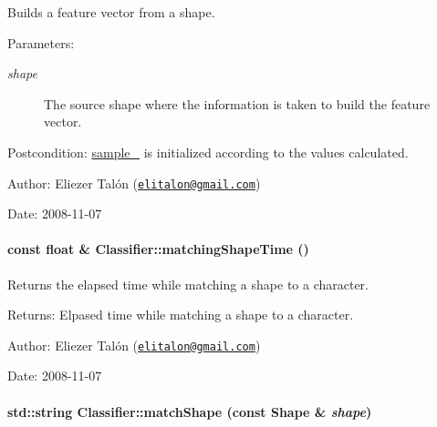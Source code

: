 Builds a feature vector from a shape. 

\begin{Desc}
\item[Parameters:]
\begin{description}
\item[{\em shape}]The source shape where the information is taken to build the feature vector.\end{description}
\end{Desc}
\begin{Desc}
\item[Postcondition:]\hyperlink{class_classifier_3d46e3d6546304f24db6d9402375988a}{sample\_\-} is initialized according to the values calculated.\end{Desc}
\begin{Desc}
\item[Author:]Eliezer Talón (\href{mailto:elitalon@gmail.com}{\tt elitalon@gmail.com}) \end{Desc}
\begin{Desc}
\item[Date:]2008-11-07 \end{Desc}
\hypertarget{class_classifier_775756b0f6e5472a13bb1fa15290f14c}{
\paragraph[{matchingShapeTime}]{\setlength{\rightskip}{0pt plus 5cm}const float \& Classifier::matchingShapeTime ()}\hfill}
\label{class_classifier_775756b0f6e5472a13bb1fa15290f14c}


Returns the elapsed time while matching a shape to a character. 

\begin{Desc}
\item[Returns:]Elpased time while matching a shape to a character.\end{Desc}
\begin{Desc}
\item[Author:]Eliezer Talón (\href{mailto:elitalon@gmail.com}{\tt elitalon@gmail.com}) \end{Desc}
\begin{Desc}
\item[Date:]2008-11-07 \end{Desc}
\hypertarget{class_classifier_6fd6a8332d3188ac605ff452ab6dc9c2}{
\paragraph[{matchShape}]{\setlength{\rightskip}{0pt plus 5cm}std::string Classifier::matchShape (const {\bf Shape} \& {\em shape})}\hfill}
\label{class_classifier_6fd6a8332d3188ac605ff452ab6dc9c2}


